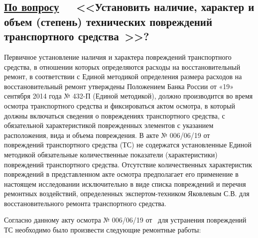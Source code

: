 \renewcommand\baselinestretch{0.86}\small\normalsize 
\subsection{\underline{По  вопросу}\, \, \,	\textbf{\small{<<Установить наличие, характер и объем (степень) технических повреждений транспортного средства  \tc \,>>?}}}
\renewcommand\baselinestretch{1.2}\small\normalsize
%
%
Первичное установление наличия и характера повреждений транспортного средства, в отношении которых определяются расходы на восстановительный ремонт, в соответствии с  Единой методикой определения размера расходов на восстановительный ремонт 
утверждены Положением Банка России от «19» сентября 2014 года № 432-П (Единой методикой), должно производится во время осмотра транспортного средства и фиксироваться актом осмотра, в который  должны включаться сведения о повреждениях транспортного средства, с обязательной  характеристикой поврежденных элементов с указанием расположения, вида и объема повреждения.   
%
В акте № 006/06/19  от \osm\, повреждений транспортного средства (ТС)  не содержатся установленные Единой методикой обязательные количественные показатели (характеристики) повреждений транспортного средства.  Отсутствие количественных характеристик повреждений в представленном акте осмотра предполагает его применение в настоящем исследовании исключительно в виде списка повреждений и перечня ремонтных воздействий, определенных экспертом-техником Яковлевым С.В. для восстановительного ремонта транспортного средства. %
%
%
\par
Согласно данному акту осмотра № 006/06/19  от \osm \, для устранения повреждений ТС необходимо было произвести следующие ремонтные работы:

